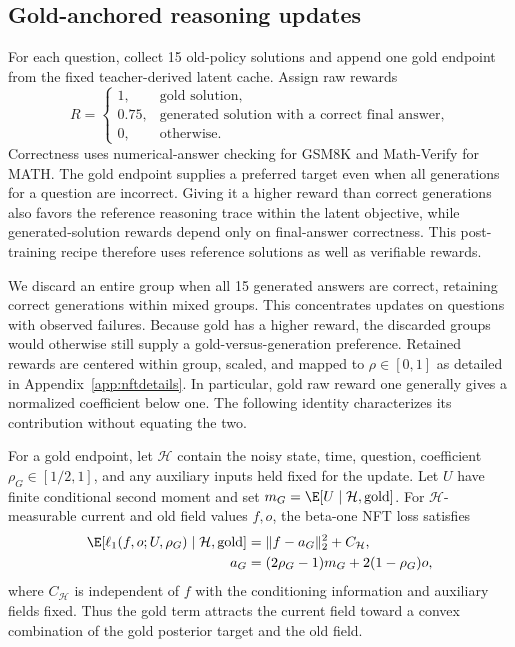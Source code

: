 \subsection{Gold-anchored reasoning updates}
\label{sec:nftgold}

For each question, collect 15 old-policy solutions and append one gold endpoint from the fixed teacher-derived latent cache. Assign raw rewards
\begin{equation}
 R=\begin{cases}
  1,&\text{gold solution},\\
  0.75,&\text{generated solution with a correct final answer},\\
  0,&\text{otherwise}.
 \end{cases}
 \label{eq:nftrewardtiers}
\end{equation}
Correctness uses numerical-answer checking for GSM8K and Math-Verify for MATH. The gold endpoint supplies a preferred target even when all generations for a question are incorrect. Giving it a higher reward than correct generations also favors the reference reasoning trace within the latent objective, while generated-solution rewards depend only on final-answer correctness. This post-training recipe therefore uses reference solutions as well as verifiable rewards.

We discard an entire group when all 15 generated answers are correct, retaining correct generations within mixed groups. This concentrates updates on questions with observed failures. Because gold has a higher reward, the discarded groups would otherwise still supply a gold-versus-generation preference. Retained rewards are centered within group, scaled, and mapped to $\rho\in[0,1]$ as detailed in Appendix~\ref{app:nftdetails}. In particular, gold raw reward one generally gives a normalized coefficient below one. The following identity characterizes its contribution without equating the two.

\begin{lemma}
\label{lem:goldanchor}
For a gold endpoint, let $\mathcal H$ contain the noisy state, time, question, coefficient $\rho_G\in[1/2,1]$, and any auxiliary inputs held fixed for the update. Let $U$ have finite conditional second moment and set $m_G=\E[U\mid\mathcal H,\mathrm{gold}]$. For $\mathcal H$-measurable current and old field values $f,o$, the beta-one NFT loss satisfies
\begin{equation}
\begin{split}
 \E[\ell_1(f,o;U,\rho_G)\mid\mathcal H,\mathrm{gold}]
 &=\|f-a_G\|_2^2+C_{\mathcal H},\\
 a_G&=(2\rho_G-1)m_G+2(1-\rho_G)o,
\end{split}
\label{eq:nftgoldanchor}
\end{equation}
where $C_{\mathcal H}$ is independent of $f$ with the conditioning information and auxiliary fields fixed. Thus the gold term attracts the current field toward a convex combination of the gold posterior target and the old field.
\end{lemma}

